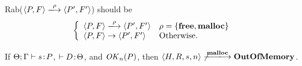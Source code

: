 \begin{myDef}
  \label{df:Rab}
  Rab(\(\langle P, F \rangle \xlongrightarrow{\rho} \langle P', F' \rangle\)) should be
  \[
    \left\{
   \begin{array}{ll}
     \langle P, F \rangle \xlongrightarrow{\rho} \langle P', F' \rangle & \rho = \{\Free, \Malloc\}\\
     \langle P, F \rangle \rightarrow \langle P', F' \rangle & \mbox{Otherwise.}
   \end{array}
   \right.
\]

\end{myDef}


\begin{lemma}
\label{lem:immediateSafety}
If \(\Theta; \Gamma \vdash s \!:\! P \), \(\vdash D \!:\! \Theta\), and
\(\mathit{OK}_n(P)\), then \(\langle H, R, s, n \rangle
\not\xlongrightarrow{\Malloc} \OVERFLOW \).
\end{lemma}
